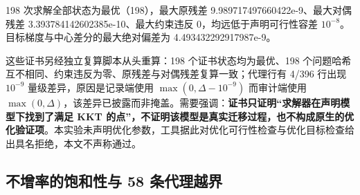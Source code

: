\documentclass[11pt,a4paper]{article}
\begin{document}
198 次求解全部状态为最优（198），最大原残差
9.989717497660422e-9、最大对偶残差 3.393784142602385e-10、最大约束违反
0，均远低于声明可行性容差
\(10^{-8}\)。目标梯度与中心差分的最大绝对偏差为 4.493432292917987e-9。

这些证书另经独立复算脚本从头重算：198 个证书状态均为最优、198
个问题哈希互不相同、约束违反为零、原残差与对偶残差复算一致；代理行有
4/396 行出现 \(10^{-9}\) 量级差异，原因是记录端使用
\(\max(0,\Delta-10^{-9})\) 而审计端使用
\(\max(0,\Delta)\)，该差异已披露而非掩盖。需要强调：\textbf{证书只证明``求解器在声明模型下找到了满足
KKT
的点''，不证明该模型是真实迁移过程，也不构成原生的优化验证项}。本实验未声明优化参数，工具据此对优化可行性检查与优化目标检查给出具名拒绝，本文不声称通过。

\subsection{不增率的饱和性与 58
条代理越界}\label{ux4e0dux589eux7387ux7684ux9971ux548cux6027ux4e0e-58-ux6761ux4ee3ux7406ux8d8aux754c}
\end{document}

